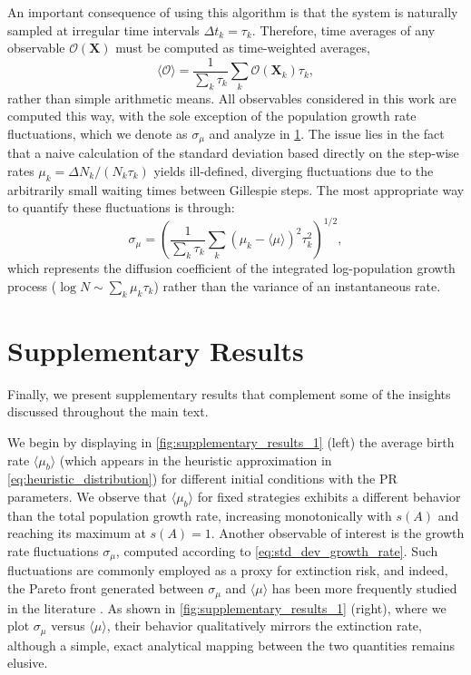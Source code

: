 \documentclass[aps,pre,reprint,10pt,superscriptaddress]{revtex4-2}
\begin{document}
\begin{appendices}
    An important consequence of using this algorithm is that the system is naturally sampled at irregular time intervals $\Delta t_k=\tau_k$. Therefore, time averages of any observable $\mathcal{O}(\mathbf{X})$ must be computed as time-weighted averages,
    \begin{equation}
        \langle\mathcal{O}\rangle=\frac{1}{\sum_k\tau_k}\sum_k\mathcal{O}(\mathbf{X}_k)\tau_k,
    \end{equation}
    rather than simple arithmetic means. All observables considered in this work are computed this way, with the sole exception of the population growth rate fluctuations, which we denote as $\sigma_\mu$ and analyze in \cref{sec:supplementary_results}. The issue lies in the fact that a naive calculation of the standard deviation based directly on the step-wise rates $\mu_k=\Delta N_k/(N_k\tau_k)$ yields ill-defined, diverging fluctuations due to the arbitrarily small waiting times between Gillespie steps. The most appropriate way to quantify these fluctuations is through:
    \begin{equation} \label{eq:std_dev_growth_rate}
        \sigma_\mu=\left(\frac{1}{\sum_k\tau_k}\sum_k\left(\mu_k-\langle\mu\rangle\right)^2\tau_k^2\right)^{1/2},
    \end{equation}
    which represents the diffusion coefficient of the integrated log-population growth process ($\log N\sim\sum_k\mu_k\tau_k$) rather than the variance of an instantaneous rate.

    \section{Supplementary Results} \label{sec:supplementary_results}

    Finally, we present supplementary results that complement some of the insights discussed throughout the main text.

    We begin by displaying in \cref{fig:supplementary_results_1} (left) the average birth rate $\langle\mu_b\rangle$ (which appears in the heuristic approximation in \cref{eq:heuristic_distribution}) for different initial conditions with the PR parameters. We observe that $\langle\mu_b\rangle$ for fixed strategies exhibits a different behavior than the total population growth rate, increasing monotonically with $s(A)$ and reaching its maximum at $s(A)=1$. Another observable of interest is the growth rate fluctuations $\sigma_\mu$, computed according to \cref{eq:std_dev_growth_rate}. Such fluctuations are commonly employed as a proxy for extinction risk, and indeed, the Pareto front generated between $\sigma_\mu$ and $\langle\mu\rangle$ has been more frequently studied in the literature \cite{dinisPhaseTransitionsOptimal2020,dinisParetooptimalTradeoffPhenotypic2022}. As shown in \cref{fig:supplementary_results_1} (right), where we plot $\sigma_\mu$ versus $\langle\mu\rangle$, their behavior qualitatively mirrors the extinction rate, although a simple, exact analytical mapping between the two quantities remains elusive.


\end{appendices}
\end{document}
